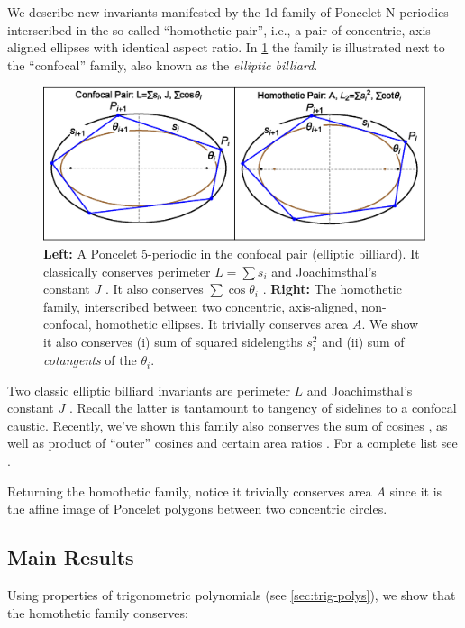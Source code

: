 We describe new invariants manifested by the 1d family of Poncelet N-periodics interscribed in the so-called ``homothetic pair'', i.e., a pair of concentric, axis-aligned ellipses with identical aspect ratio. In \cref{fig:confocal_homot} the family is illustrated next to the ``confocal'' family, also known as the {\em elliptic billiard}.

\begin{figure}
    \centering
    \includegraphics[width=\textwidth]{pics/0010_confocal_homot.eps}
    \caption{\textbf{Left:} A Poncelet 5-periodic in the confocal pair (elliptic billiard). It classically conserves perimeter $L=\sum{s_i}$ and Joachimsthal's constant $J$ \cite{sergei91}. It also conserves $\sum\cos\theta_i$ \cite{akopyan2020-invariants,bialy2020-invariants,reznik2020-intelligencer}. \textbf{Right:} The homothetic family, interscribed between two concentric, axis-aligned, non-confocal, homothetic ellipses. It trivially conserves area $A$. We show it also conserves (i) sum of squared sidelengths $s_i^2$ and (ii) sum of {\em cotangents} of the $\theta_i$.}
    \label{fig:confocal_homot}
\end{figure}

 Two classic elliptic billiard invariants are perimeter $L$ and Joachimsthal's constant $J$  \cite{sergei91}. Recall the latter is tantamount to tangency of sidelines to a confocal caustic. Recently, we've shown this family also conserves the sum of cosines \cite{akopyan2020-invariants,bialy2020-invariants}, as well as product of ``outer'' cosines and certain area ratios \cite{caliz2020-area-product,reznik2020-intelligencer}. For a complete list see \cite{reznik2021-fifty}.

Returning the homothetic family, notice it trivially conserves area $A$ since it is  the affine image of Poncelet polygons between two concentric circles.

\subsection*{Main Results} Using properties of trigonometric polynomials (see \cref{sec:trig-polys}), we show that the homothetic family conserves:

